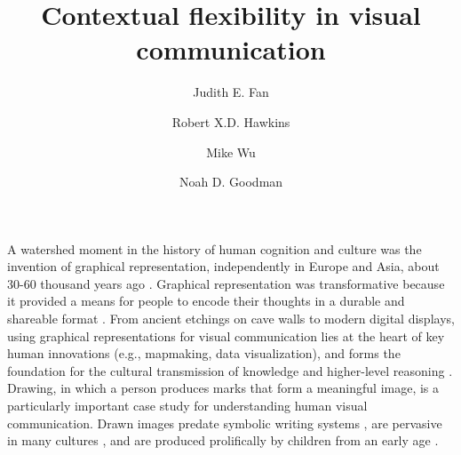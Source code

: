 \documentclass[9pt,twocolumn,twoside]{pnas-new}
\title{Contextual flexibility in visual communication}
\author[a,1]{Judith E. Fan}
\author[a]{Robert X.D. Hawkins}
\author[b]{Mike Wu}
\author[a,b]{Noah D. Goodman}
\affil[a]{Department of Psychology, Stanford University}
\affil[b]{Department of Computer Science, Stanford University}
\begin{document}
\verticaladjustment{-2pt}

\maketitle
\thispagestyle{firststyle}


A watershed moment in the history of human cognition and culture was the invention of graphical representation, independently in Europe and Asia, about 30-60 thousand years ago \cite{hoffmann2018u,Aubert:2014jy}. Graphical representation was transformative because it provided a means for people to encode their thoughts in a durable and shareable format \cite{donald1991origins}. From ancient etchings on cave walls to modern digital displays, using graphical representations for visual communication lies at the heart of key human innovations (e.g., mapmaking, data visualization), and forms the foundation for the cultural transmission of knowledge and higher-level reasoning \cite{tomasello2009cultural,card1999readings}. Drawing, in which a person produces marks that form a meaningful image, is a particularly important case study for understanding human visual communication. Drawn images predate symbolic writing systems \cite{clottes2008cave}, are pervasive in many cultures \cite{gombrich1989story}, and are produced prolifically by children from an early age \cite{kellogg1969analyzing}.
\end{document}
